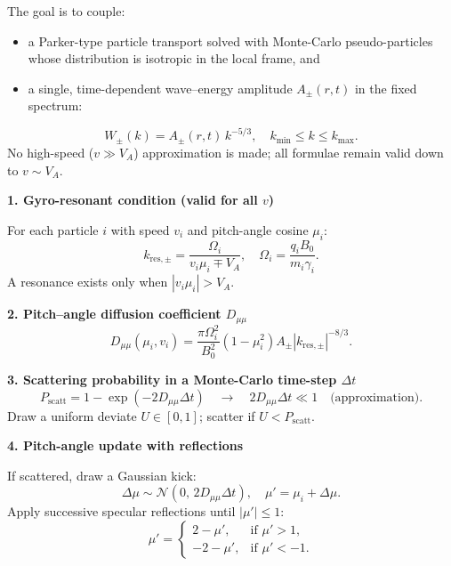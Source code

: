 \begin{tcolorbox}[colframe=black, colback=white, title=Self-Contained Monte-Carlo Recipe for Solar-Wind Ions]

The goal is to couple:
\begin{itemize}
    \item a Parker-type particle transport solved with Monte-Carlo pseudo-particles whose distribution is isotropic in the local frame, and
    \item a single, time-dependent wave–energy amplitude \( A_{\pm}(r, t) \) in the fixed spectrum:
\end{itemize}
\[
W_{\pm}(k) = A_{\pm}(r, t) \, k^{-5/3}, \quad k_{\min} \leq k \leq k_{\max}.
\]
No high-speed (\( v \gg V_A \)) approximation is made; all formulae remain valid down to \( v \sim V_A \).

\bigskip

\textbf{1. Gyro-resonant condition (valid for all \( v \))}

For each particle \( i \) with speed \( v_i \) and pitch-angle cosine \( \mu_i \):
\[
k_{\text{res},\pm} = \frac{\Omega_i}{v_i \mu_i \mp V_A}, \quad \Omega_i = \frac{q_i B_0}{m_i \gamma_i}.
\tag{1}
\]
A resonance exists only when \( |v_i \mu_i| > V_A \).

\bigskip

\textbf{2. Pitch–angle diffusion coefficient \( D_{\mu\mu} \)}
\[
D_{\mu\mu}(\mu_i, v_i) = \frac{\pi \Omega_i^2}{B_0^2} (1 - \mu_i^2) A_{\pm} |k_{\text{res},\pm}|^{-8/3}.
\tag{2}
\]

\bigskip

\textbf{3. Scattering probability in a Monte-Carlo time-step \( \Delta t \)}
\[
P_{\text{scatt}} = 1 - \exp\left( -2 D_{\mu\mu} \Delta t \right) \quad \rightarrow \quad 2 D_{\mu\mu} \Delta t \ll 1 \quad \text{(approximation)}.
\tag{3}
\]
Draw a uniform deviate \( U \in [0, 1] \); scatter if \( U < P_{\text{scatt}} \).

\bigskip

\textbf{4. Pitch-angle update with reflections}

If scattered, draw a Gaussian kick:
\[
\Delta \mu \sim \mathcal{N}(0, \, 2 D_{\mu\mu} \Delta t), \quad \mu' = \mu_i + \Delta \mu.
\]
Apply successive specular reflections until \( |\mu'| \leq 1 \):
\[
\mu' =
\begin{cases}
2 - \mu', & \text{if } \mu' > 1, \\
-2 - \mu', & \text{if } \mu' < -1.
\end{cases}
\tag{4}
\]

\bigskip

\end{tcolorbox}
